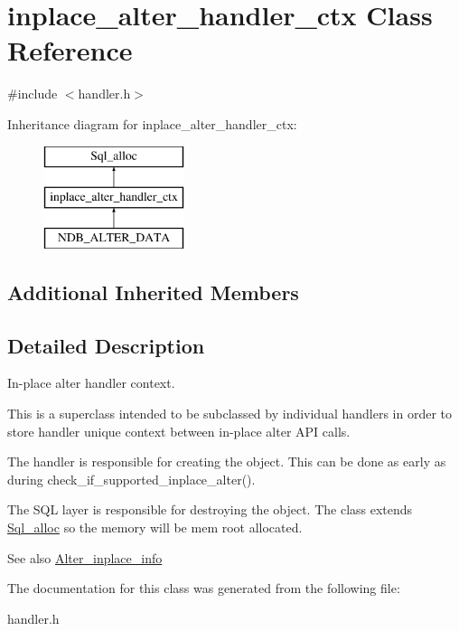 \hypertarget{classinplace__alter__handler__ctx}{}\section{inplace\+\_\+alter\+\_\+handler\+\_\+ctx Class Reference}
\label{classinplace__alter__handler__ctx}


{\ttfamily \#include $<$handler.\+h$>$}

Inheritance diagram for inplace\+\_\+alter\+\_\+handler\+\_\+ctx\+:\begin{figure}[H]
\begin{center}
\leavevmode
\includegraphics[height=3.000000cm]{classinplace__alter__handler__ctx}
\end{center}
\end{figure}
\subsection*{Additional Inherited Members}


\subsection{Detailed Description}
In-\/place alter handler context.

This is a superclass intended to be subclassed by individual handlers in order to store handler unique context between in-\/place alter A\+PI calls.

The handler is responsible for creating the object. This can be done as early as during check\+\_\+if\+\_\+supported\+\_\+inplace\+\_\+alter().

The S\+QL layer is responsible for destroying the object. The class extends \mbox{\hyperlink{classSql__alloc}{Sql\+\_\+alloc}} so the memory will be mem root allocated.

\begin{DoxySeeAlso}{See also}
\mbox{\hyperlink{classAlter__inplace__info}{Alter\+\_\+inplace\+\_\+info}} 
\end{DoxySeeAlso}


The documentation for this class was generated from the following file\+:\begin{DoxyCompactItemize}
\item 
handler.\+h\end{DoxyCompactItemize}
